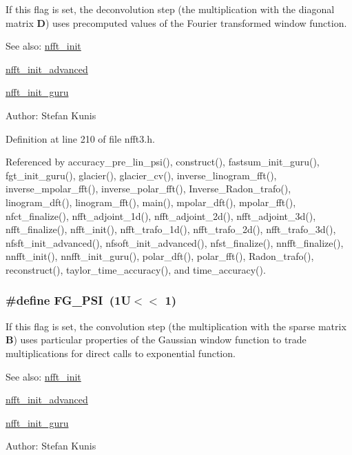 If this flag is set, the deconvolution step (the multiplication with the diagonal matrix $\mathbf{D}$) uses precomputed values of the Fourier transformed window function. 

\begin{Desc}
\item[See also:]\hyperlink{group__nfft_g1dfeaf18f3735f035afa62ca768d99c4}{nfft\_\-init} 

\hyperlink{group__nfft_gcd4a22fd1f6ea476a57759a90510d114}{nfft\_\-init\_\-advanced} 

\hyperlink{group__nfft_g406f05717c6299b918261c61aaa9de23}{nfft\_\-init\_\-guru} \end{Desc}
\begin{Desc}
\item[Author:]Stefan Kunis \end{Desc}


Definition at line 210 of file nfft3.h.

Referenced by accuracy\_\-pre\_\-lin\_\-psi(), construct(), fastsum\_\-init\_\-guru(), fgt\_\-init\_\-guru(), glacier(), glacier\_\-cv(), inverse\_\-linogram\_\-fft(), inverse\_\-mpolar\_\-fft(), inverse\_\-polar\_\-fft(), Inverse\_\-Radon\_\-trafo(), linogram\_\-dft(), linogram\_\-fft(), main(), mpolar\_\-dft(), mpolar\_\-fft(), nfct\_\-finalize(), nfft\_\-adjoint\_\-1d(), nfft\_\-adjoint\_\-2d(), nfft\_\-adjoint\_\-3d(), nfft\_\-finalize(), nfft\_\-init(), nfft\_\-trafo\_\-1d(), nfft\_\-trafo\_\-2d(), nfft\_\-trafo\_\-3d(), nfsft\_\-init\_\-advanced(), nfsoft\_\-init\_\-advanced(), nfst\_\-finalize(), nnfft\_\-finalize(), nnfft\_\-init(), nnfft\_\-init\_\-guru(), polar\_\-dft(), polar\_\-fft(), Radon\_\-trafo(), reconstruct(), taylor\_\-time\_\-accuracy(), and time\_\-accuracy().\hypertarget{group__nfft_g01ebac2d2071639df189f083fc9f24eb}{
\subsubsection{\setlength{\rightskip}{0pt plus 5cm}\#define FG\_\-PSI~(1U$<$$<$ 1)}}
\label{group__nfft_g01ebac2d2071639df189f083fc9f24eb}


If this flag is set, the convolution step (the multiplication with the sparse matrix $\mathbf{B}$) uses particular properties of the Gaussian window function to trade multiplications for direct calls to exponential function. 

\begin{Desc}
\item[See also:]\hyperlink{group__nfft_g1dfeaf18f3735f035afa62ca768d99c4}{nfft\_\-init} 

\hyperlink{group__nfft_gcd4a22fd1f6ea476a57759a90510d114}{nfft\_\-init\_\-advanced} 

\hyperlink{group__nfft_g406f05717c6299b918261c61aaa9de23}{nfft\_\-init\_\-guru} \end{Desc}
\begin{Desc}
\item[Author:]Stefan Kunis \end{Desc}



